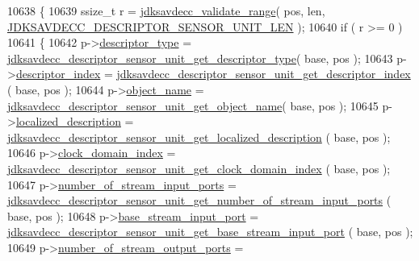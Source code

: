 \begin{DoxyCode}
10638 \{
10639     ssize\_t r = \hyperlink{group__util_ga9c02bdfe76c69163647c3196db7a73a1}{jdksavdecc\_validate\_range}( pos, len, 
      \hyperlink{group__descriptor__sensor_ga86d13f35db3884976a492d3e35f9f853}{JDKSAVDECC\_DESCRIPTOR\_SENSOR\_UNIT\_LEN} );
10640     \textcolor{keywordflow}{if} ( r >= 0 )
10641     \{
10642         p->\hyperlink{structjdksavdecc__descriptor__sensor__unit_ab7c32b6c7131c13d4ea3b7ee2f09b78d}{descriptor\_type} = 
      \hyperlink{group__descriptor__sensor_ga5d13b3d75f4d991d4eda17cab924c6b4}{jdksavdecc\_descriptor\_sensor\_unit\_get\_descriptor\_type}(
       base, pos );
10643         p->\hyperlink{structjdksavdecc__descriptor__sensor__unit_a042bbc76d835b82d27c1932431ee38d4}{descriptor\_index} = 
      \hyperlink{group__descriptor__sensor_ga55f6c803a4d76731eee01618f1518f5e}{jdksavdecc\_descriptor\_sensor\_unit\_get\_descriptor\_index}
      ( base, pos );
10644         p->\hyperlink{structjdksavdecc__descriptor__sensor__unit_a7d1f5945a13863b1762fc6db74fa8f80}{object\_name} = 
      \hyperlink{group__descriptor__sensor_ga5f9be104aea9cffe08726cef31facf3e}{jdksavdecc\_descriptor\_sensor\_unit\_get\_object\_name}( base, 
      pos );
10645         p->\hyperlink{structjdksavdecc__descriptor__sensor__unit_a0926f846ca65a83ad5bb06b4aff8f408}{localized\_description} = 
      \hyperlink{group__descriptor__sensor_ga0360666fafecdd1a534f8ed718cc3a5f}{jdksavdecc\_descriptor\_sensor\_unit\_get\_localized\_description}
      ( base, pos );
10646         p->\hyperlink{structjdksavdecc__descriptor__sensor__unit_a6608f023d147b556a49527d568abed8e}{clock\_domain\_index} = 
      \hyperlink{group__descriptor__sensor_gae61862cba7022c151e662c23949ebe60}{jdksavdecc\_descriptor\_sensor\_unit\_get\_clock\_domain\_index}
      ( base, pos );
10647         p->\hyperlink{structjdksavdecc__descriptor__sensor__unit_ad00c23883f3271704e11719abc6f7ad7}{number\_of\_stream\_input\_ports} = 
      \hyperlink{group__descriptor__sensor_ga504c0f247b007ce0f3928692f8422d73}{jdksavdecc\_descriptor\_sensor\_unit\_get\_number\_of\_stream\_input\_ports}
      ( base, pos );
10648         p->\hyperlink{structjdksavdecc__descriptor__sensor__unit_a8ad4ba35aee3ad22d5e946438bbaba53}{base\_stream\_input\_port} = 
      \hyperlink{group__descriptor__sensor_ga94e5515c00f9e6a20da539a3a9f7d21a}{jdksavdecc\_descriptor\_sensor\_unit\_get\_base\_stream\_input\_port}
      ( base, pos );
10649         p->\hyperlink{structjdksavdecc__descriptor__sensor__unit_a6b331604e3f2b2db126dbf0a7c81b0fa}{number\_of\_stream\_output\_ports} = 

\end{DoxyCode}
